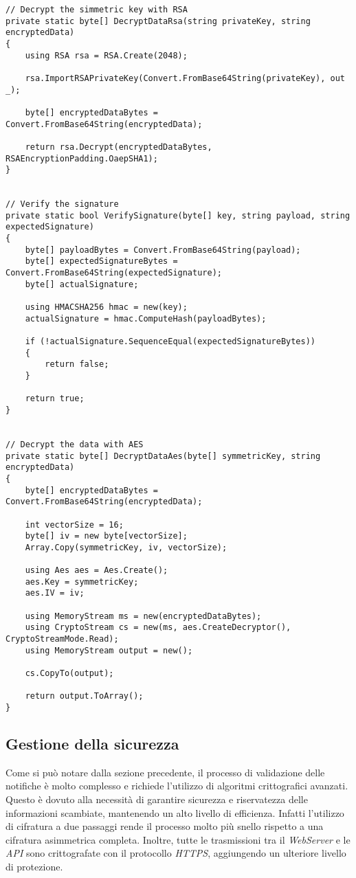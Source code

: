 \begin{lstlisting}
// Decrypt the simmetric key with RSA
private static byte[] DecryptDataRsa(string privateKey, string encryptedData)
{
	using RSA rsa = RSA.Create(2048);

	rsa.ImportRSAPrivateKey(Convert.FromBase64String(privateKey), out _);

	byte[] encryptedDataBytes = Convert.FromBase64String(encryptedData);

	return rsa.Decrypt(encryptedDataBytes, RSAEncryptionPadding.OaepSHA1);
}


// Verify the signature
private static bool VerifySignature(byte[] key, string payload, string expectedSignature)
{
	byte[] payloadBytes = Convert.FromBase64String(payload);
	byte[] expectedSignatureBytes = Convert.FromBase64String(expectedSignature);
	byte[] actualSignature;

	using HMACSHA256 hmac = new(key);
	actualSignature = hmac.ComputeHash(payloadBytes);

	if (!actualSignature.SequenceEqual(expectedSignatureBytes))
	{
		return false;
	}

	return true;
}


// Decrypt the data with AES
private static byte[] DecryptDataAes(byte[] symmetricKey, string encryptedData)
{
	byte[] encryptedDataBytes = Convert.FromBase64String(encryptedData);

	int vectorSize = 16;
	byte[] iv = new byte[vectorSize];
	Array.Copy(symmetricKey, iv, vectorSize);

	using Aes aes = Aes.Create();
	aes.Key = symmetricKey;
	aes.IV = iv;

	using MemoryStream ms = new(encryptedDataBytes);
	using CryptoStream cs = new(ms, aes.CreateDecryptor(), CryptoStreamMode.Read);
	using MemoryStream output = new();

	cs.CopyTo(output);

	return output.ToArray();
}
\end{lstlisting}

\bigskip

\subsection{Gestione della sicurezza}

Come si può notare dalla sezione precedente, il processo di validazione delle notifiche è molto complesso e richiede l'utilizzo di algoritmi crittografici avanzati.
Questo è dovuto alla necessità di garantire sicurezza e riservatezza delle informazioni scambiate, mantenendo un alto livello di efficienza.
Infatti l'utilizzo di cifratura a due passaggi rende il processo molto più snello rispetto a una cifratura asimmetrica completa.
Inoltre, tutte le trasmissioni tra il \emph{WebServer} e le \emph{API} sono crittografate con il protocollo \emph{HTTPS}, aggiungendo un ulteriore livello di protezione.

